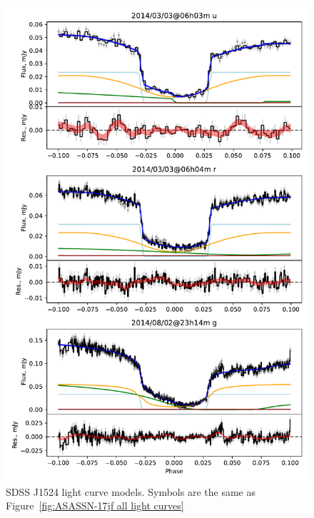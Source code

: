 %     

\begin{figure}
    \centering
    \includegraphics[width=\textwidth]{figures/results/SDSS1524/SDSS1524_1.pdf}
    \caption{SDSS J1524 light curve models. Symbols are the same as Figure~\ref{fig:ASASSN-17jf all light curves}}
    \label{fig:SDSS1524 all light curves}
\end{figure}
